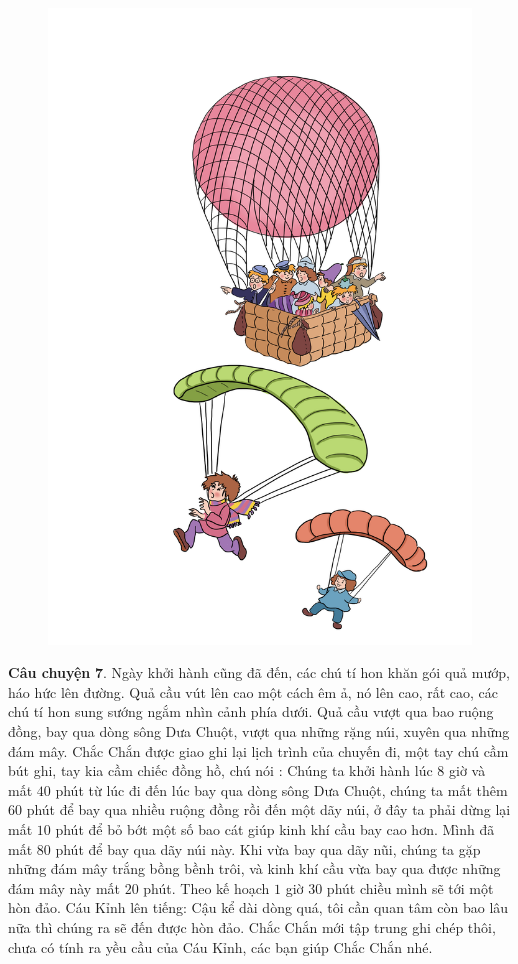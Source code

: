 	\begin{figure}[H]
		\centering
		\vspace*{-5pt}
		\captionsetup{labelformat= empty, justification=centering}
		\includegraphics[width=0.5\linewidth]{Hinh9_KinhKhiCau}
		\vspace*{-10pt}
	\end{figure}
	\textbf{\color{toancuabi}Câu chuyện} $\pmb{7.}$ Ngày khởi hành cũng đã đến, các chú tí hon khăn gói quả mướp, háo hức lên đường. Quả cầu vút lên cao một cách êm ả, nó lên cao, rất cao, các chú tí hon sung sướng ngắm nhìn cảnh phía dưới. Quả cầu vượt qua bao ruộng đồng, bay qua dòng sông Dưa Chuột, vượt qua những rặng núi, xuyên qua những đám mây. Chắc Chắn được giao ghi lại lịch trình của chuyến đi, một tay chú cầm bút ghi, tay kia cầm chiếc đồng hồ, chú nói : Chúng ta khởi hành lúc $8$ giờ và mất $40$ phút từ lúc đi đến lúc bay qua dòng sông Dưa Chuột, chúng ta mất thêm $60$ phút để bay qua nhiều ruộng đồng rồi đến một dãy núi, ở đây ta phải dừng lại mất $10$ phút để bỏ bớt một số bao cát giúp kinh khí cầu bay cao hơn.  Mình đã mất $80$ phút để bay qua dãy núi này. Khi vừa bay qua dãy nũi, chúng ta gặp những đám mây trắng bồng bềnh trôi, và kinh khí cầu vừa bay qua được những đám mây này mất $20$ phút. Theo kế hoạch $1$ giờ $30$ phút chiều mình sẽ tới một hòn đảo.
	\vskip 0.1cm
	Cáu Kỉnh lên tiếng: Cậu kể dài dòng quá, tôi cần quan tâm còn bao lâu nữa thì chúng ra sẽ đến được hòn đảo. Chắc Chắn mới tập trung ghi chép thôi, chưa có tính ra yều cầu của Cáu Kỉnh, các bạn giúp Chắc Chắn nhé. 
	
